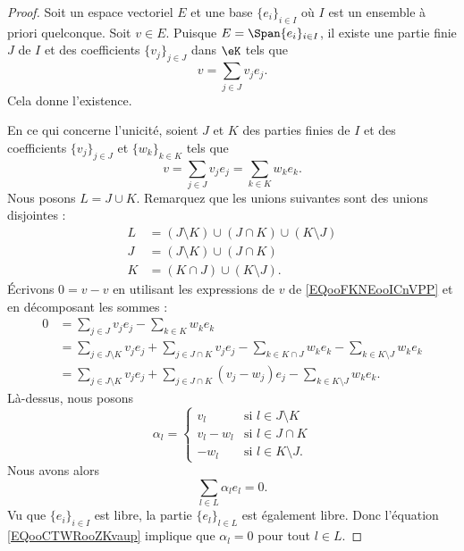 \begin{proof}
	Soit un espace vectoriel \( E\) et une base \( \{ e_i \}_{i\in I}\) où \( I\) est un ensemble à priori quelconque. Soit \( v\in E\). Puisque \( E=\Span\{ e_i \}_{i\in I}\), il existe une partie finie \( J\) de \( I\) et des coefficients \( \{ v_j \}_{j\in J}\) dans \( \eK\) tels que
	\begin{equation}
		v=\sum_{j\in J}v_je_j.
	\end{equation}
	Cela donne l'existence.

	En ce qui concerne l'unicité, soient \( J \) et \( K\) des parties finies de \( I\) et des coefficients \( \{ v_j \}_{j\in J}\) et \( \{ w_{k} \}_{k\in K}\) tels que
	\begin{equation}        \label{EQooFKNEooICnVPP}
		v=\sum_{j\in J}v_je_j=\sum_{k\in K}w_{k}e_{k}.
	\end{equation}
	Nous posons \( L=J\cup K\). Remarquez que les unions suivantes sont des unions disjointes :
	\begin{subequations}
		\begin{align}
			L & =(J\setminus K)\cup (J\cap K)\cup (K\setminus J) \\
			J & =(J\setminus K)\cup (J\cap K)                    \\
			K & =(K\cap J)\cup(K\setminus J).
		\end{align}
	\end{subequations}
	Écrivons \( 0=v-v\) en utilisant les expressions de \( v\) de \eqref{EQooFKNEooICnVPP} et en décomposant les sommes :
	\begin{subequations}
		\begin{align}
			0 & =\sum_{j\in J}v_je_j-\sum_{k\in K}w_ke_k                                                                           \\
			  & =\sum_{j\in J\setminus K}v_je_j+\sum_{j\in J\cap K}v_je_j-\sum_{k\in K\cap J}w_ke_k-\sum_{k\in K\setminus J}w_ke_k \\
			  & =\sum_{j\in J\setminus K}v_je_j+\sum_{j\in J\cap K}(v_j-w_j)e_j-\sum_{k\in K\setminus J}w_ke_k.
		\end{align}
	\end{subequations}
	Là-dessus, nous posons
	\begin{equation}
		\alpha_l=\begin{cases}
			v_l     & \text{si } l\in J\setminus K \\
			v_l-w_l & \text{si } l\in J\cap K      \\
			-w_l    & \text{si }l\in K\setminus J.
		\end{cases}
	\end{equation}
	Nous avons alors
	\begin{equation}        \label{EQooCTWRooZKvaup}
		\sum_{l\in L}\alpha_le_l=0.
	\end{equation}
	Vu que \( \{ e_i \}_{i\in I}\) est libre, la partie \( \{ e_l \}_{l\in L}\) est également libre. Donc l'équation \eqref{EQooCTWRooZKvaup} implique que \( \alpha_l=0\) pour tout \( l\in L\).


\end{proof}

